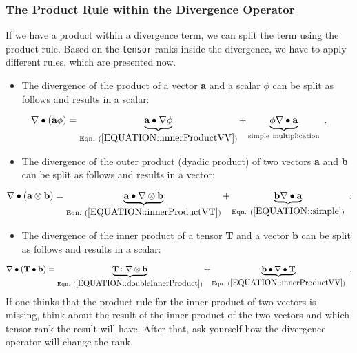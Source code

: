 \documentclass[MathematicsNumericsDerivationsAndOpenFOAM.tex]{subfiles}
\begin{document}
\subsubsection{The Product Rule within the Divergence Operator}
%
%
	If we have a product within a divergence term, we can split the term using
    the product rule. Based on the \texttt{tensor} ranks inside the divergence,
    we have to apply different rules, which are presented now.
%
%
\begin{itemize}
    \item The divergence of the product of a vector \textbf{a} and a scalar
    $\phi$ can be split as follows and results in a scalar:
\end{itemize}
%
%
\begin{equation}
 \nabla \bullet (\textbf{a} \phi)  =  \underbrace{\textbf{a} \bullet \nabla \phi}_{\mathrm{Eqn.~} (\ref{EQUATION::innerProductVV})} + \underbrace{\phi \nabla \bullet \textbf{a}}_{\mathrm{simple~multiplication}}~.
 \label{EQUATION::productRuleVS}
\end{equation}
%
%
\begin{itemize}
    \item The divergence of the outer product (dyadic product) of two vectors
    \textbf{a} and \textbf{b} can be split as follows and results in a vector:
\end{itemize}
%
%
\begin{equation}
 \nabla \bullet (\textbf{a} \otimes \textbf{b})  =  \underbrace{\textbf{a} \bullet \nabla \otimes \textbf{b}}_{\mathrm{Eqn.~}(\ref{EQUATION::innerProductVT})} + \underbrace{\textbf{b} \nabla \bullet \textbf{a}}_{\mathrm{Eqn.~}(\ref{EQUATION::simple})} ~.
 \label{EQUATION::productRuleVV}
\end{equation}
%
%
\begin{itemize}
    \item The divergence of the inner product of a tensor \textbf{T} and a
    vector $\textbf{b}$ can be split as follows and results in a scalar:
\end{itemize}
%
%
\begin{equation}
 \nabla \bullet (\textbf{T} \bullet \textbf{b})  =  \underbrace{\textbf{T} \boldsymbol \colon \nabla \otimes \textbf{b}}_{\mathrm{Eqn.~} (\ref{EQUATION::doubleInnerProduct})} + \underbrace{\textbf{b} \bullet \nabla \bullet \textbf{T}}_{\mathrm{Eqn.~}(\ref{EQUATION::innerProductVV})} ~.
 \label{EQUATION::productRuleTV}
\end{equation}
%
%
	If one thinks that the product rule for the inner product of two vectors
    is missing, think about the result of the inner product of the two vectors
    and which tensor rank the result will have. After that, ask yourself how
    the divergence operator will change the rank.
%
%
%
%
\end{document}
